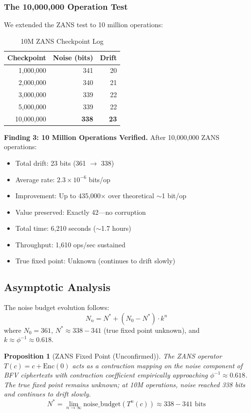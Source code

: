 \documentclass[11pt]{article}
\newtheorem{proposition}{Proposition}
\begin{document}
\subsubsection{The 10,000,000 Operation Test}

We extended the ZANS test to 10 million operations:

\begin{table}[h]
\centering
\caption{10M ZANS Checkpoint Log}
\begin{tabular}{r|r|r}
\textbf{Checkpoint} & \textbf{Noise (bits)} & \textbf{Drift} \\
\hline
1,000,000 & 341 & 20 \\
2,000,000 & 340 & 21 \\
3,000,000 & 339 & 22 \\
5,000,000 & 339 & 22 \\
10,000,000 & \textbf{338} & \textbf{23}
\end{tabular}
\end{table}

\textbf{Finding 3: 10 Million Operations Verified.} After 10,000,000 ZANS operations:
\begin{itemize}
    \item Total drift: 23 bits (361 $\to$ 338)
    \item Average rate: $2.3 \times 10^{-6}$ bits/op
    \item Improvement: Up to 435,000$\times$ over theoretical $\sim$1 bit/op
    \item Value preserved: Exactly 42—no corruption
    \item Total time: 6,210 seconds ($\sim$1.7 hours)
    \item Throughput: 1,610 ops/sec sustained
    \item True fixed point: Unknown (continues to drift slowly)
\end{itemize}

\subsection{Asymptotic Analysis}

The noise budget evolution follows:
\begin{equation}
N_n = N^* + (N_0 - N^*) \cdot k^n
\end{equation}
where $N_0 = 361$, $N^* \approx 338-341$ (true fixed point unknown), and $k \approx \phi^{-1} \approx 0.618$.

\begin{proposition}[ZANS Fixed Point (Unconfirmed)]
The ZANS operator $T(c) = c + \text{Enc}(0)$ acts as a contraction mapping on the noise component of BFV ciphertexts with contraction coefficient empirically approaching $\phi^{-1} \approx 0.618$. The true fixed point remains unknown; at 10M operations, noise reached 338 bits and continues to drift slowly.
\begin{equation}
N^* = \lim_{n\to\infty} \text{noise\_budget}(T^n(c)) \approx 338-341 \text{ bits}
\end{equation}
\end{proposition}
\end{document}
